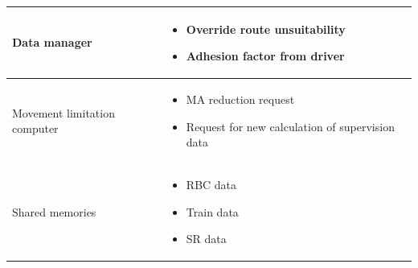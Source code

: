 \documentclass[nocc]{template/openetcs_report}
\begin{document}
\begin{longtable}{|l|l|}
				\hline	
								
					\begin{minipage}[t]{0.35\linewidth} Data manager	\end{minipage} 
				&	\begin{minipage}[t]{0.65\linewidth}
						\begin{itemize}
							\item Override route unsuitability
							\item Adhesion factor from driver
						\end{itemize}			
					\end{minipage} \\
				
				\hline	
									
					\begin{minipage}[t]{0.35\linewidth} Movement limitation computer	\end{minipage} 
				&	\begin{minipage}[t]{0.65\linewidth}
						\begin{itemize}
							\item MA reduction request 
							\item Request for new calculation of supervision data
						\end{itemize}			
					\end{minipage} \\
				
				\hline														
				
					\begin{minipage}[t]{0.35\linewidth} Shared memories	\end{minipage} 
				&	\begin{minipage}[t]{0.65\linewidth}
						\begin{itemize}
							\item RBC data
							\item Train data
							\item SR data
						\end{itemize}				
					\end{minipage} \\
				
				\hline	
			\end{longtable}
				
\newpage				
\end{document}

